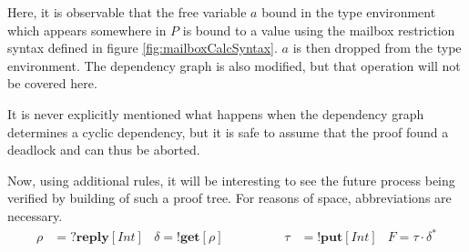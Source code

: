 Here, it is observable that the free variable $a$ bound in the type environment which appears somewhere in $P$ is bound to a value using the mailbox restriction syntax defined in figure \ref{fig:mailboxCalcSyntax}. $a$ is then dropped from the type environment. The dependency graph is also modified, but that operation will not be covered here.

It is never explicitly mentioned what happens when the dependency graph determines a cyclic dependency, but it is safe to assume that the proof found a deadlock and can thus be aborted.

Now, using additional rules, it will be interesting to see the future process being verified by building of such a proof tree. For reasons of space, abbreviations are necessary.
\begin{align*}
    \rho &= ?\textbf{reply}[Int]
    &\delta = !\textbf{get}[\rho]\hspace{2cm}
    \tau &= !\textbf{put}[Int] 
    &F = \tau \cdot \delta^*
\end{align*}

